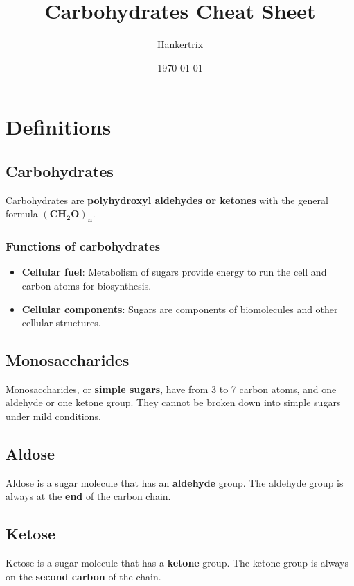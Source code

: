 \documentclass[11pt]{article}
\author{Hankertrix}
\date{\today}
\title{Carbohydrates Cheat Sheet}
\begin{document}
\maketitle
\setcounter{tocdepth}{2}
\tableofcontents \clearpage\newpage

\section{Definitions}
\label{sec:org90b1a52}

\subsection{Carbohydrates}
\label{sec:org49f8a54}
Carbohydrates are \textbf{polyhydroxyl aldehydes or ketones} with the general formula \(\boldsymbol{(CH_2O)_n}\).

\subsubsection{Functions of carbohydrates}
\label{sec:org73d24d9}
\begin{itemize}
\item \textbf{Cellular fuel}: Metabolism of sugars provide energy to run the cell and carbon atoms for biosynthesis.
\item \textbf{Cellular components}: Sugars are components of biomolecules and other cellular structures.
\end{itemize}

\subsection{Monosaccharides}
\label{sec:orgbcfea10}
Monosaccharides, or \textbf{simple sugars}, have from 3 to 7 carbon atoms, and one aldehyde or one ketone group. They cannot be broken down into simple sugars under mild conditions.

\subsection{Aldose}
\label{sec:org6b6a1ac}
Aldose is a sugar molecule that has an \textbf{aldehyde} group. The aldehyde group is always at the \textbf{end} of the carbon chain.

\subsection{Ketose}
\label{sec:orgc09416f}
Ketose is a sugar molecule that has a \textbf{ketone} group. The ketone group is always on the \textbf{second carbon} of the chain.
\end{document}
